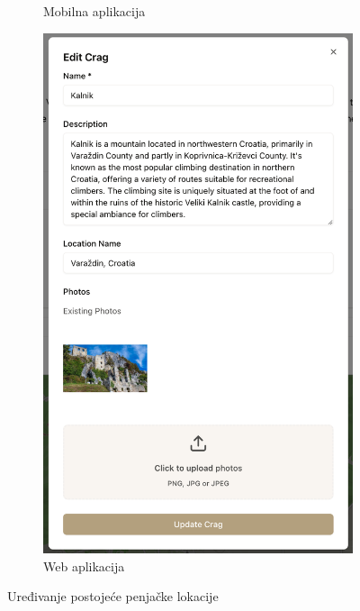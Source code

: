 \begin{figure}[H]
\begin{subfigure}[b]{0.36\textwidth}
        \caption{Mobilna aplikacija}
        \label{fig:uredjivanje_lokacije_mob}
    \end{subfigure}
    \hfill
    \begin{subfigure}[b]{0.47\textwidth}
        \centering
        \includegraphics[width=\textwidth]{images/implementacija/web/editing-options/edit-crag.png}
        \caption{Web aplikacija}
        \label{fig:uredjivanje_lokacije_web}
    \end{subfigure}
    \caption{Uređivanje postojeće penjačke lokacije}
    \label{fig:uredjivanje_lokacije}
\end{figure}

